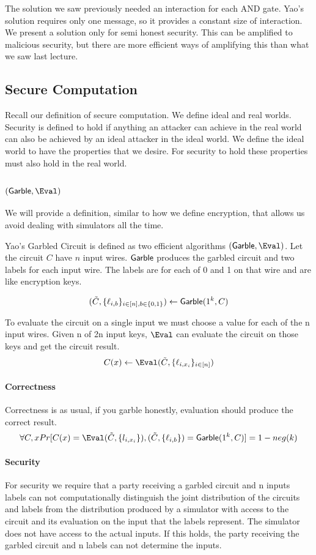 The solution we saw previously needed an interaction for each AND gate.
Yao's solution requires only one message,
so it provides a constant size of interaction.
We present a solution only for semi honest security. 
This can be amplified to malicious security, 
but there are more efficient ways of amplifying this than what we saw last lecture.

\subsection{Secure Computation}

Recall our definition of secure computation. 
We define ideal and real worlds. 
Security is defined to hold if 
anything an attacker can achieve in the real world 
 can also be achieved by an ideal attacker in the ideal world. 
We define the ideal world to have the properties that we desire. 
For security to hold these properties must also hold in the real world.

\subsection{$(\Garble, \Eval)$}
We will provide a definition, similar to how we define encryption, that allows us avoid dealing with simulators all the time. 


Yao's Garbled Circuit is defined as two efficient algorithms $(\Garble, \Eval)$. Let the circuit $C$ have $n$ input wires.
$\mathsf{Garble}$ produces the garbled circuit and two labels for each input wire. The labels are for each of 0 and 1 on that wire and are like encryption keys. 

\[
(\tilde{C}, \{\ell_{i,b}\}_{i \in [n], b \in \{0,1\}}) \leftarrow \mathsf{Garble}(1^k, C) 
\]

To evaluate the circuit on a single input we must choose a value for each of the n input wires.
Given n of 2n input keys, $\Eval$ can evaluate the circuit on those keys and get the circuit result.
\[
C(x) \leftarrow \Eval(\tilde{C}, \{\ell_{i, x_i}\}_{i \in [n]}) 
\]

\paragraph{Correctness}
Correctness is as usual, if you garble honestly, evaluation should produce the correct result. 
\[
\forall C, x 
Pr[ C(x) = \Eval(\tilde{C}, \{l_{i, x_i}\}),  (\tilde{C}, \{\ell_{i,b}\}) = \Garble(1^k, C)] = 1 - neg(k)
\]


\paragraph{Security}
For security we require that a party receiving 
a garbled circuit and n inputs labels 
can not computationally distinguish the joint distribution of the circuits and labels
from the distribution produced by 
a simulator with access to the circuit and its evaluation on the input that the labels represent. 
The simulator does not have access to the actual inputs.
If this holds, the party receiving the garbled circuit and n labels can not determine the inputs.

